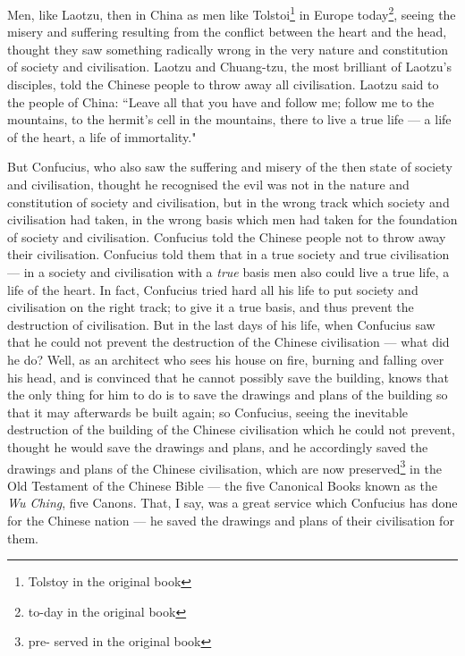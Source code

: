 Men, like Laotzu,  then in China as men like Tolstoi\footnote{Tolstoy in the original book}  in Europe today\footnote{to-day in the original book}, seeing the misery and suffering resulting from the conflict between the heart and the head, thought they saw something radically wrong in the very nature and constitution of society and civilisation.
Laotzu and Chuang-tzu,  the most brilliant of Laotzu's disciples, told the Chinese people to throw away all civilisation.
Laotzu said to the people of China: ``Leave all that you have and follow me; follow me to the mountains, to the hermit's cell in the mountains, there to live a true life --- a life of the heart, a life of immortality."

But Confucius, who also saw the suffering and misery of the then state of society and civilisation, thought he recognised the evil was not in the nature and constitution of society and civilisation, but in the wrong track which society and civilisation had taken, in the wrong basis which men had taken for the foundation of society and civilisation.
Confucius told the Chinese people not to throw away their civilisation.
Confucius told them that in a true society and true civilisation --- in a society and civilisation with a \emph{true} basis men also could live a true life, a life of the heart.
In fact, Confucius tried hard all his life to put society and civilisation on the right track; to give it a true basis, and thus prevent the destruction of civilisation.
But in the last days of his life, when Confucius saw that he could not prevent the destruction of the Chinese civilisation --- what did he do?
Well, as an architect who sees his house on fire, burning and falling over his head, and is convinced that he cannot possibly save the building, knows that the only thing for him to do is to save the drawings and plans of the building so that it may afterwards be built again;
so Confucius, seeing the inevitable destruction of the building of the Chinese civilisation which he could not prevent, thought he would save the drawings and plans, and he accordingly saved the drawings and plans of the Chinese civilisation, which are now preserved\footnote{pre- served in the original book} in the Old Testament of the Chinese Bible --- the five Canonical Books known as the \emph{Wu Ching}, five Canons.
That, I say, was a great service which Confucius has done for the Chinese nation --- he saved the drawings and plans of their civilisation for them.

